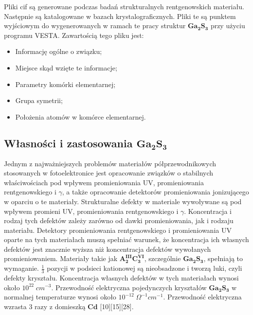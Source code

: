 Pliki cif są generowane podczas badań strukturalnych rentgenowskich materiału. Następnie są katalogowane w bazach krystalograficznych. Pliki te są punktem wyjściowym do wygenerowanych w ramach te pracy struktur $\mathbf{Ga_{2}S_{3}}$ przy użyciu programu VESTA. Zawartością tego pliku jest:
\begin{itemize}
	\item Informację ogólne o związku;
	\item Miejsce skąd wzięte te informacje;
	\item Parametry komórki elementarnej;
	\item Grupa symetrii;
	\item Położenia atomów w komórce elementarnej. 
\end{itemize} 

\subsection{Własności i zastosowania $\mathbf{Ga_{2}S_{3}}$}
Jednym z najważniejszych problemów materiałów półprzewodnikowych stosowanych w fotoelektronice jest opracowanie związków o stabilnych właściwościach pod wpływem promieniowania UV, promieniowania rentgenowskiego i $\gamma$, a także opracowanie detektorów promieniowania jonizującego w oparciu o te materiały. Strukturalne defekty w materiale wywoływane są pod wpływem promieni UV, promieniowania rentgenowskiego i $\gamma$. Koncentracja i rodzaj tych defektów zależy zarówno od dawki promieniowania, jak i rodzaju materiału. Detektory promieniowania rentgenowskiego i promieniowania UV oparte na tych materiałach muszą spełniać warunek, że koncentracja ich własnych defektów jest znacznie wyższa niż koncentracja defektów wywołanych promieniowaniem. Materiały takie jak $\mathbf{A_{2}^{III}C_{3}^{VI}}$, szczególnie $\mathbf{Ga_{2}S_{3}}$, spełniają to wymaganie. $\frac{1}{3}$ pozycji w podsieci kationowej są nieobsadzone i tworzą luki, czyli defekty kryształu. Koncentracja własnych defektów w tych materiałach wynosi około $10^{22}\;cm^{-3}$. Przewodność elektryczna pojedynczych kryształów $\mathbf{Ga_{2}S_{3}}$ w normalnej temperaturze wynosi około $10^{-12}\;\Omega^{-1}cm^{-1}$. Przewodność elektryczna wzrasta 3 razy z domieszką $\mathbf{Cd}$ [10][15][28].
